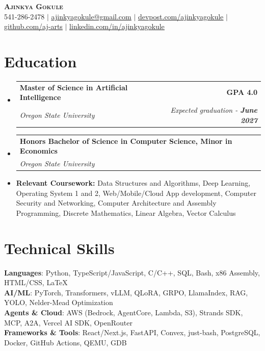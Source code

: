 \documentclass[letterpaper,11pt]{article}
\makeatletter
\newcommand{\resumeItem}[1]{%
\item\small{%
    {#1\vspace{-2pt}}%
  }%
}
\newcommand{\resumeSubheading}[4]{
  \vspace{-2pt}
\item
  \begin{tabular*}{0.97\textwidth}[t]{l@{\extracolsep{\fill}}r}
    \textbf{#1} & #2 \\
    \textit{\small#3} & \textit{\small #4} \\
  \end{tabular*}\vspace{-7pt}
}
\newcommand{\resumeSubHeadingListStart}{
\begin{itemize}[leftmargin=0.15in, label={}]}
\newcommand{\resumeSubHeadingListEnd}{
\end{itemize}}
\makeatother
\begin{document}
\begin{center}
	\textbf{\Huge \scshape Ajinkya Gokule} \\ \vspace{1pt}
	\small 541-286-2478
	$|$
	\href{mailto:ajinkyagokule@gmail.com}{\underline{ajinkyagokule@gmail.com}}
	$|$
	\href{https://devpost.com/ajinkyagokule}{\underline{devpost.com/ajinkyagokule}}
	$|$
	\href{https://github.com/aj-arts}{\underline{github.com/aj-arts}}
	$|$
	\href{https://linkedin.com/in/ajinkyagokule}{\underline{linkedin.com/in/ajinkyagokule}}

\end{center}


\section{Education}
\resumeSubHeadingListStart

\resumeSubheading
{Master of Science in Artificial Intelligence}{\textbf{GPA 4.0}}
{Oregon State University}{Expected graduation - \textbf{June 2027}}

\resumeSubheading
{Honors Bachelor of Science in Computer Science, Minor in Economics}{}
{Oregon State University}{}

\resumeItem{\textbf{Relevant Coursework: }Data Structures and Algorithms,
	Deep Learning, Operating System 1 and 2,
	Web/Mobile/Cloud App development,
	Computer Security and Networking,
	Computer Architecture and Assembly Programming,
	Discrete Mathematics,
	Linear Algebra,
	Vector Calculus
}
\resumeSubHeadingListEnd

\section{Technical Skills}
\begin{itemize}[leftmargin=0.15in, label={}]
	\small{
	\item{
		      \textbf{Languages}{: Python, TypeScript/JavaScript, C/C++, SQL, Bash, x86 Assembly, HTML/CSS, LaTeX} \\
		      \textbf{AI/ML}{: PyTorch, Transformers, vLLM, QLoRA, GRPO, LlamaIndex, RAG, YOLO, Nelder-Mead Optimization} \\
		      \textbf{Agents \& Cloud}{: AWS (Bedrock, AgentCore, Lambda, S3), Strands SDK, MCP, A2A, Vercel AI SDK, OpenRouter} \\
		      \textbf{Frameworks \& Tools}{: React/Next.js, FastAPI, Convex, just-bash, PostgreSQL, Docker, GitHub Actions, QEMU, GDB}
	      }}
\end{itemize}
\end{document}
